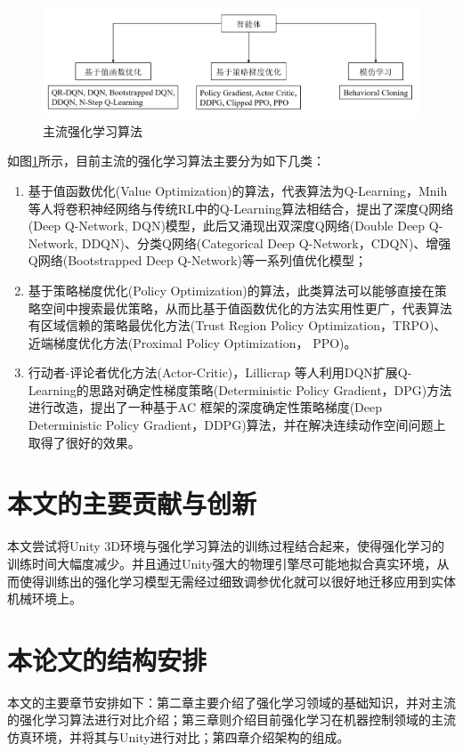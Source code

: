 \documentclass[bachelor]{thesis-uestc}
\begin{document}
	\begin{figure}
		\includegraphics[width=15cm]{./pic/fg6.jpg}
		\caption{主流强化学习算法}
		\label{fg6}
	\end{figure}
	
	如图\ref{fg6}所示，目前主流的强化学习算法主要分为如下几类：
	\begin{enumerate}
		\item 基于值函数优化(Value Optimization)的算法，代表算法为Q-Learning，Mnih 等人将卷积神经网络与传统RL中的Q-Learning算法相结合，提出了深度Q网络(Deep Q-Network, DQN)模型，此后又涌现出双深度Q网络(Double Deep Q-Network, DDQN)、分类Q网络(Categorical Deep Q-Network，CDQN)、增强Q网络(Bootstrapped Deep Q-Network)等一系列值优化模型；
		
		\item 基于策略梯度优化(Policy Optimization)的算法，此类算法可以能够直接在策略空间中搜索最优策略，从而比基于值函数优化的方法实用性更广，代表算法有区域信赖的策略最优化方法(Trust Region Policy Optimization，TRPO)、近端梯度优化方法(Proximal Policy Optimization， PPO)。
		
		\item 行动者-评论者优化方法(Actor-Critic)，Lillicrap 等人利用DQN扩展Q-Learning的思路对确定性梯度策略(Deterministic Policy Gradient，DPG)方法进行改造，提出了一种基于AC 框架的深度确定性策略梯度(Deep Deterministic Policy Gradient，DDPG)算法，并在解决连续动作空间问题上取得了很好的效果。
	\end{enumerate}
	
	\section{本文的主要贡献与创新}
	本文尝试将Unity 3D环境与强化学习算法的训练过程结合起来，使得强化学习的训练时间大幅度减少。并且通过Unity强大的物理引擎尽可能地拟合真实环境，从而使得训练出的强化学习模型无需经过细致调参优化就可以很好地迁移应用到实体机械环境上。
	
	\section{本论文的结构安排}
	本文的主要章节安排如下：第二章主要介绍了强化学习领域的基础知识，并对主流的强化学习算法进行对比介绍；第三章则介绍目前强化学习在机器控制领域的主流仿真环境，并将其与Unity进行对比；第四章介绍架构的组成。
	
\end{document}
